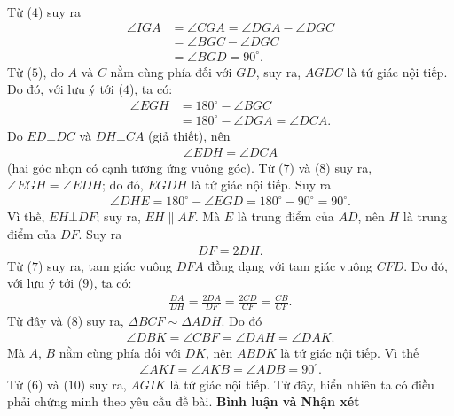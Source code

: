 \begin{multicols}{2}
\begin{align*}
	\end{align*}
	Từ ($4$) suy ra
	\begin{align*}
		\angle IGA &= \angle CGA = \angle DGA - \angle DGC \\
		&= \angle BGC - \angle DGC \\
		&= \angle BGD = {90^{\circ}}. \tag{$6$}
	\end{align*}
	Từ ($5$), do $A$ và $C$ nằm cùng phía đối với $GD$, suy ra, $AGDC$ là tứ giác nội tiếp. Do đó, với lưu ý tới ($4$), ta có:
	\begin{align*}
		\angle EGH &= {180^{\circ}} - \angle BGC \\
		&= {180^{\circ}} - \angle DGA = \angle DCA. \tag{$7$}
	\end{align*}
	Do $ED \bot DC$ và $DH \bot CA$ (giả thiết), nên
	\begin{align*}
		\angle EDH = \angle DCA  \tag{$8$}
	\end{align*}
	(hai góc nhọn có cạnh tương ứng vuông góc).
	\vskip 0.05cm
	Từ ($7$) và ($8$) suy ra, $\angle EGH = \angle EDH$; do đó, $EGDH$ là tứ giác nội tiếp. Suy ra
	\begin{align*}
		\angle DHE \!=\!\! {180^{\circ}} \!-\! \angle EGD \!=\! {180^{\circ}} \!\!-\! {90^{\circ}} \!=\! {90^{\circ}}.
	\end{align*}
	Vì thế, $EH \bot DF$; suy ra, $EH \parallel AF$. Mà $E$ là trung điểm của $AD$, nên $H$ là trung điểm của $DF$. Suy ra
	\begin{align*}
		DF = 2DH.                     \tag{$9$}
	\end{align*}
	Từ ($7$) suy ra, tam giác vuông $DFA$ đồng dạng với tam giác vuông $CFD$. Do đó, với lưu ý tới ($9$), ta có:
	\begin{align*}
		\frac{{DA}}{{DH}} = \frac{{2DA}}{{DF}} = \frac{{2CD}}{{CF}} = \frac{{CB}}{{CF}}.
	\end{align*}
	Từ đây và ($8$) suy ra, $\Delta BCF \sim \Delta ADH$. Do đó
	\begin{align*}
		\angle DBK = \angle CBF = \angle DAH = \angle DAK.
	\end{align*}
	Mà $A$, $B$ nằm cùng phía đối với $DK$, nên $ABDK$ là tứ giác nội tiếp. Vì thế
	\begin{align*}
		\angle AKI = \angle AKB = \angle ADB = 90^{\circ}. \tag{$10$}
	\end{align*}
	Từ ($6$) và ($10$) suy ra, $AGIK$ là tứ giác nội tiếp. Từ đây, hiển nhiên ta có điều phải chứng minh theo yêu cầu đề bài.
	\vskip 0.05cm
	\textbf{\color{thachthuctoanhoc}Bình luận và Nhận xét}
	\vskip 0.05cm

\end{multicols}
